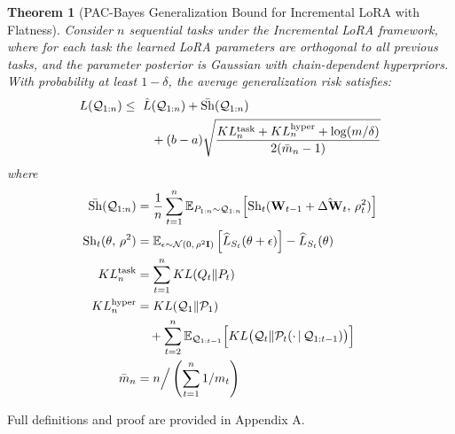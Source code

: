 \documentclass[letterpaper]{article} %
\newtheorem{theorem}{Theorem}
\begin{document}
\begin{theorem}[PAC-Bayes Generalization Bound for Incremental LoRA with Flatness]
Consider $n$ sequential tasks under the Incremental LoRA framework, where for each task the learned LoRA parameters are orthogonal to all previous tasks, and the parameter posterior is Gaussian with chain-dependent hyperpriors. With probability at least $1-\delta$, the average generalization risk satisfies:
\begin{align}
L(\mathcal{Q}_{1:n}) \leq\; 
    &\ \hat{L}(\mathcal{Q}_{1:n}) 
      + \bar{\mathrm{Sh}}(\mathcal{Q}_{1:n}) \notag \\
    &\quad + (b-a)\sqrt{
        \frac{KL_{n}^{\text{task}} + KL_{n}^{\text{hyper}} + \log(m/\delta)}{2(\bar{m}_{n} - 1)}
    }
\end{align}
where
\begin{align}
\bar{\mathrm{Sh}}(\mathcal{Q}_{1:n}) 
    &=\frac{1}{n} \sum_{t=1}^{n}
        \mathbb{E}_{P_{1:n} \sim \mathcal{Q}_{1:n}} 
        \Big[ \notag 
        \mathrm{Sh}_t(
            \mathbf{W}_{t-1} + \hat{\Delta\mathbf{W}}_t,\, \rho_t^2
        )
        \Big]
    \notag \\
\mathrm{Sh}_t(\theta,\, \rho^2) 
    &= \mathbb{E}_{\epsilon \sim \mathcal{N}(0,\, \rho^2 \mathbf{I})} 
        \left[
            \widehat{L}_{S_t}(\theta + \epsilon)
        \right] 
        - \widehat{L}_{S_t}(\theta) \notag\\
KL^{\text{task}}_n &= \sum_{t=1}^n KL(Q_t \| P_t) \notag \\
KL^{\text{hyper}}_n &= KL(\mathcal{Q}_1 \| \mathcal{P}_1) \notag \\
   &\quad + \sum_{t=2}^n 
        \mathbb{E}_{\mathcal{Q}_{1:t-1}} \Big[
            KL\big(\mathcal{Q}_t \| \mathcal{P}_t(\cdot\,|\,\mathcal{Q}_{1:t-1})\big)
        \Big] \notag\\
\bar{m}_n &= n \Big/ \left(\sum_{t=1}^n 1/m_t\right) \notag
\end{align}
\end{theorem}
Full definitions and proof are provided in Appendix A.




\end{document}
